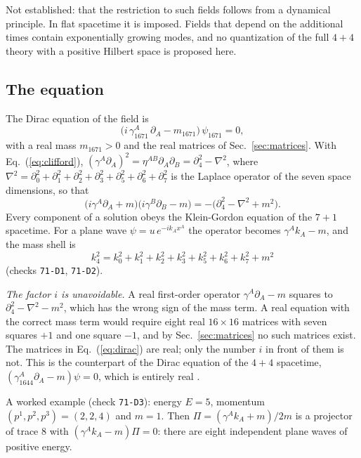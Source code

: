 Not established: that the restriction to such fields follows from a dynamical principle. In flat
spacetime it is imposed. Fields that depend on the additional times contain exponentially growing
modes, and no quantization of the full $4+4$ theory with a positive Hilbert space is proposed here.
\subsection{The equation}

The Dirac equation of the field is
\begin{equation}
\big(i\,\gamma_{1671}^A\,\partial_A-m_{1671}\big)\,\psi_{1671}=0,
\label{eq:dirac}
\end{equation}
with a real mass $m_{1671}>0$ and the real matrices of Sec.~\ref{sec:matrices}. With
Eq.~(\ref{eq:clifford}),
$(\gamma^A\partial_A)^2=\eta^{AB}\partial_A\partial_B=\partial_4^2-\nabla^2$, where
$\nabla^2=\partial_0^2+\partial_1^2+\partial_2^2+\partial_3^2+\partial_5^2+\partial_6^2+\partial_7^2$
is the Laplace operator of the seven space dimensions, so that
\begin{equation}
\big(i\gamma^A\partial_A+m\big)\big(i\gamma^B\partial_B-m\big)=-\big(\partial_4^2-\nabla^2+m^2\big).
\label{eq:kg}
\end{equation}
Every component of a solution obeys the Klein-Gordon equation of the $7+1$ spacetime. For a plane
wave $\psi=u\,e^{-ik_Ax^A}$ the operator becomes $\gamma^Ak_A-m$, and the mass shell is
\begin{equation}
k_4^2=k_0^2+k_1^2+k_2^2+k_3^2+k_5^2+k_6^2+k_7^2+m^2
\label{eq:shell}
\end{equation}
(checks \texttt{71-D1}, \texttt{71-D2}).

\emph{The factor $i$ is unavoidable.} A real first-order operator $\gamma^A\partial_A-m$ squares to
$\partial_4^2-\nabla^2-m^2$, which has the wrong sign of the mass term. A real equation with the
correct mass term would require eight real $16\times16$ matrices with seven squares $+1$ and one
square $-1$, and by Sec.~\ref{sec:matrices} no such matrices exist. The matrices in
Eq.~(\ref{eq:dirac}) are real; only the number $i$ in front of them is not. This is the counterpart of
the Dirac equation of the $4+4$ spacetime, $(\gamma_{1644}^A\partial_A-m)\psi=0$, which is entirely
real \cite{Companion1644}.

A worked example (check \texttt{71-D3}): energy $E=5$, momentum $(p^1,p^2,p^3)=(2,2,4)$ and $m=1$. Then
$\Pi=(\gamma^Ak_A+m)/2m$ is a projector of trace 8 with $(\gamma^Ak_A-m)\Pi=0$: there are eight
independent plane waves of positive energy.

